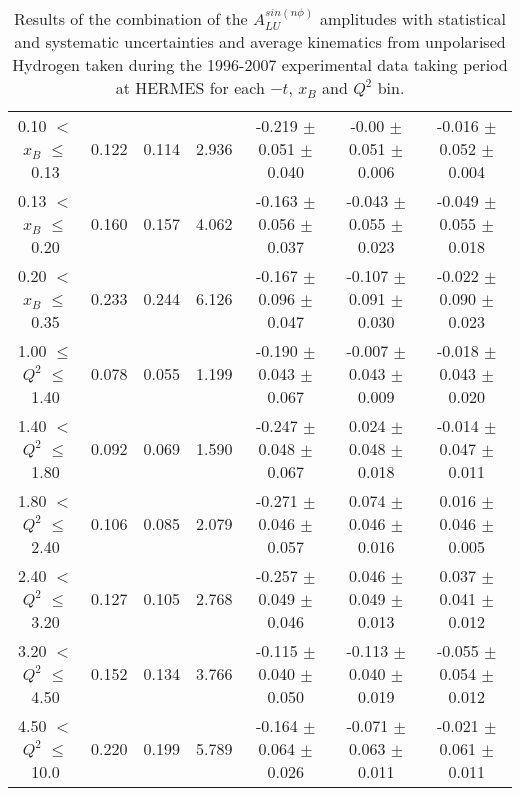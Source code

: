 {\begin{table}[width=15cm]
\begin{center}
{\begin{tabular}{|c|c|c|c|c|c|c|}
0.10 $<$ $x_{B}$ $\leqslant$ 0.13 &  0.122 &  0.114 &  2.936 &  -0.219 $\pm$   0.051  $\pm$   0.040 &
-0.00  $\pm$  0.051 $\pm$    0.006 & -0.016 $\pm$ 0.052  $\pm$   0.004\\
0.13 $<$ $x_{B}$ $\leqslant$ 0.20 &  0.160 & 0.157 &  4.062 &  -0.163 $\pm$   0.056  $\pm$   0.037 &
-0.043  $\pm$  0.055 $\pm$    0.023 & -0.049 $\pm$   0.055  $\pm$   0.018\\
0.20 $<$ $x_{B}$ $\leqslant$ 0.35 &  0.233 & 0.244 &  6.126 &  -0.167  $\pm$  0.096 $\pm$    0.047 &
-0.107  $\pm$  0.091  $\pm$   0.030 & -0.022 $\pm$  0.090 $ \pm$  0.023\\
\hline
1.00 $\leqslant$ $Q^{2}$ $\leqslant$ 1.40 &  0.078 & 0.055  & 1.199  &  -0.190  $\pm$  0.043  $\pm$   0.067 &
-0.007 $\pm$   0.043  $\pm$   0.009 & -0.018  $\pm$  0.043  $\pm$   0.020\\
1.40 $<$ $Q^{2}$ $\leqslant$ 1.80 &  0.092 & 0.069 &  1.590  &  -0.247  $\pm$  0.048  $\pm$   0.067 &
0.024 $\pm$  0.048  $\pm$   0.018 & -0.014 $\pm$   0.047  $\pm$   0.011\\
1.80 $<$ $Q^{2}$ $\leqslant$ 2.40 &  0.106 & 0.085 &  2.079  &  -0.271 $\pm$  0.046  $\pm$   0.057 &
0.074 $\pm$   0.046  $\pm$   0.016 & 0.016  $\pm$  0.046  $\pm$   0.005\\
2.40 $<$ $Q^{2}$ $\leqslant$ 3.20 &  0.127 & 0.105  & 2.768  &  -0.257  $\pm$  0.049   $\pm$  0.046 & 
0.046  $\pm$  0.049  $\pm$   0.013 & 0.037  $\pm$  0.041  $\pm$   0.012\\
3.20 $<$ $Q^{2}$ $\leqslant$ 4.50 &  0.152 & 0.134 &  3.766  &  -0.115  $\pm$  0.040  $\pm$   0.050 &
-0.113  $\pm$  0.040  $\pm$   0.019 & -0.055  $\pm$  0.054  $\pm$   0.012 \\
4.50 $<$ $Q^{2}$ $\leqslant$ 10.0 &  0.220 & 0.199 &  5.789  &  -0.164 $\pm$ 0.064  $\pm$   0.026 &
-0.071  $\pm$  0.063 $\pm$    0.011 & -0.021  $\pm$  0.061  $\pm$  0.011\\
\hline
  \end{tabular}
}
 \end{center}
\caption{Results of the combination of the $A_{LU}^{sin(n\phi)}$ amplitudes with statistical and systematic uncertainties and average kinematics from unpolarised Hydrogen taken during
the 1996-2007 experimental data taking period at HERMES for each $-t$, $x_{B}$ and $Q^{2}$ bin.
}
\end{table}


}
